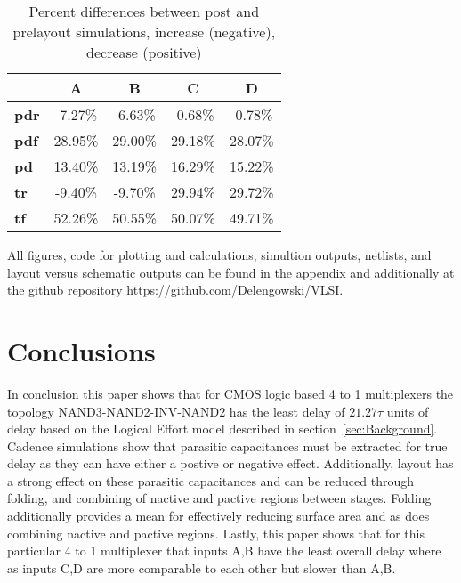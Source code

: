 \documentclass[conference]{IEEEtran}
\begin{document}
\begin{table}[H]
\center
\begin{tabular}{|l|c|c|c|c|}
\hline
             & \textbf{A} & \textbf{B} & \textbf{C} & \textbf{D} \\ \hline
\textbf{pdr} & -7.27\%    & -6.63\%    & -0.68\%    & -0.78\%    \\ \hline
\textbf{pdf} & 28.95\%    & 29.00\%    & 29.18\%    & 28.07\%    \\ \hline
\textbf{pd}  & 13.40\%    & 13.19\%    & 16.29\%    & 15.22\%    \\ \hline
\textbf{tr}  & -9.40\%    & -9.70\%    & 29.94\%    & 29.72\%    \\ \hline
\textbf{tf}  & 52.26\%    & 50.55\%    & 50.07\%    & 49.71\%    \\ \hline
\end{tabular}
\caption{Percent differences between post and prelayout simulations, increase (negative), decrease (positive)}
\label{tab:percentDiff}
\end{table}

All figures, code for plotting and calculations, simultion outputs, netlists, and layout versus schematic outputs can be found in the appendix and additionally at the github repository \url{https://github.com/Delengowski/VLSI}.


\section{Conclusions}
\label{sec:Conclusions}
In conclusion this paper shows that for CMOS logic based 4 to 1 multiplexers the topology NAND3-NAND2-INV-NAND2 has the least delay of $21.27\tau$ units of delay based on the Logical Effort model described in section~\ref{sec:Background}. Cadence simulations show that parasitic capacitances must be extracted for true delay as they can have either a postive or negative effect. Additionally, layout has a strong effect on these parasitic capacitances and can be reduced through folding, and combining of nactive and pactive regions between stages. Folding additionally provides a mean for effectively reducing surface area and as does combining nactive and pactive regions. Lastly, this paper shows that for this particular 4 to 1 multiplexer that inputs A,B have the least overall delay where as inputs C,D are more comparable to each other but slower than A,B. 



\end{document}
